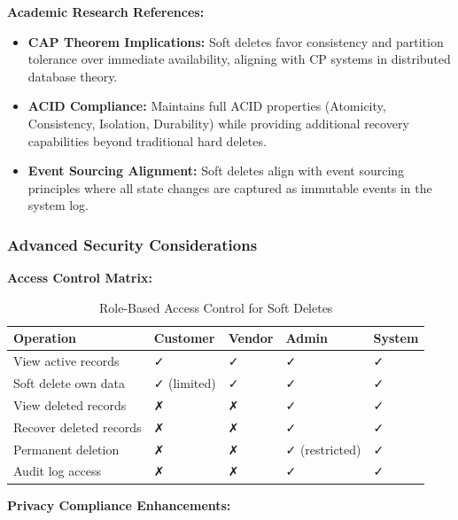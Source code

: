 \documentclass[12pt,a4paper]{article}
\begin{document}
\begin{tcolorbox}[colback=primaryblue!5, colframe=primaryblue, boxrule=1pt, arc=3pt, left=10pt, right=10pt, top=8pt, bottom=8pt]
\vspace{0.5em}

\textbf{Academic Research References:}

\begin{itemize}[leftmargin=2em, itemsep=6pt]
    \item \textbf{CAP Theorem Implications:} Soft deletes favor consistency and partition tolerance over immediate availability, aligning with CP systems in distributed database theory.
    \item \textbf{ACID Compliance:} Maintains full ACID properties (Atomicity, Consistency, Isolation, Durability) while providing additional recovery capabilities beyond traditional hard deletes.
    \item \textbf{Event Sourcing Alignment:} Soft deletes align with event sourcing principles where all state changes are captured as immutable events in the system log.
\end{itemize}

\subsubsection{Advanced Security Considerations}

\textbf{Access Control Matrix:}

\begin{table}[H]
\centering
\small
\begin{tabular}{|p{3cm}|p{2.5cm}|p{2.5cm}|p{2.5cm}|p{2.5cm}|}
\hline
\textbf{Operation} & \textbf{Customer} & \textbf{Vendor} & \textbf{Admin} & \textbf{System} \\
\hline
View active records & ✓ & ✓ & ✓ & ✓ \\
\hline
Soft delete own data & ✓ (limited) & ✓ & ✓ & ✓ \\
\hline
View deleted records & ✗ & ✗ & ✓ & ✓ \\
\hline
Recover deleted records & ✗ & ✗ & ✓ & ✓ \\
\hline
Permanent deletion & ✗ & ✗ & ✓ (restricted) & ✓ \\
\hline
Audit log access & ✗ & ✗ & ✓ & ✓ \\
\hline
\end{tabular}
\caption{Role-Based Access Control for Soft Deletes}
\end{table}

\vspace{0.5em}

\textbf{Privacy Compliance Enhancements:}


\end{tcolorbox}
\end{document}
